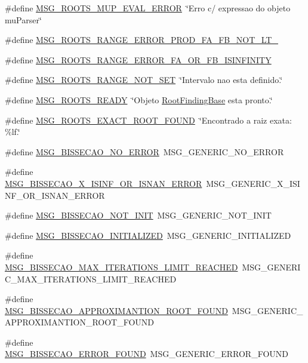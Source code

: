 \begin{CompactItemize}
\#define \hyperlink{group____messages_g4c5e1f67fc078b0bb717e112d9ecad23}{MSG\_\-ROOTS\_\-MUP\_\-EVAL\_\-ERROR}~\char`\"{}Erro c/ expressao do objeto muParser\char`\"{}
\item 
\#define \hyperlink{group____messages_g1257e2172f0d24792e5bae382b6c8ffd}{MSG\_\-ROOTS\_\-RANGE\_\-ERROR\_\-PROD\_\-FA\_\-FB\_\-NOT\_\-LT\_}
\item 
\#define \hyperlink{group____messages_ge0c1e0d68faa6da65e9ff27c587fe1e7}{MSG\_\-ROOTS\_\-RANGE\_\-ERROR\_\-FA\_\-OR\_\-FB\_\-ISINFINITY}
\item 
\#define \hyperlink{group____messages_g351b0a132b97b932e9152973ca84ab0f}{MSG\_\-ROOTS\_\-RANGE\_\-NOT\_\-SET}~\char`\"{}Intervalo nao esta definido.\char`\"{}
\item 
\#define \hyperlink{group____messages_gf99c4ab1f930201e0632f3d2e3267438}{MSG\_\-ROOTS\_\-READY}~\char`\"{}Objeto \hyperlink{structRootFindingBase}{RootFindingBase} esta pronto.\char`\"{}
\item 
\#define \hyperlink{group____messages_gb6dcd48efc265c326e568344c2040775}{MSG\_\-ROOTS\_\-EXACT\_\-ROOT\_\-FOUND}~\char`\"{}Encontrado a raiz exata: \%lf.\char`\"{}
\item 
\#define \hyperlink{group____messages_g1327a0d7098c8506ebbba8fa51a2861c}{MSG\_\-BISSECAO\_\-NO\_\-ERROR}~MSG\_\-GENERIC\_\-NO\_\-ERROR
\item 
\#define \hyperlink{group____messages_g40526857730e9af294e61ff82c37c989}{MSG\_\-BISSECAO\_\-X\_\-ISINF\_\-OR\_\-ISNAN\_\-ERROR}~MSG\_\-GENERIC\_\-X\_\-ISINF\_\-OR\_\-ISNAN\_\-ERROR
\item 
\#define \hyperlink{group____messages_g532d2bf3026df42582d5fa103bbc3188}{MSG\_\-BISSECAO\_\-NOT\_\-INIT}~MSG\_\-GENERIC\_\-NOT\_\-INIT
\item 
\#define \hyperlink{group____messages_gd7a7400cbd6447204201e1338a9faf5e}{MSG\_\-BISSECAO\_\-INITIALIZED}~MSG\_\-GENERIC\_\-INITIALIZED
\item 
\#define \hyperlink{group____messages_gad91cc85f95e709099e9e0b7c4c78648}{MSG\_\-BISSECAO\_\-MAX\_\-ITERATIONS\_\-LIMIT\_\-REACHED}~MSG\_\-GENERIC\_\-MAX\_\-ITERATIONS\_\-LIMIT\_\-REACHED
\item 
\#define \hyperlink{group____messages_g419a2b04764be63f8c5bd9a2d561fbdf}{MSG\_\-BISSECAO\_\-APPROXIMANTION\_\-ROOT\_\-FOUND}~MSG\_\-GENERIC\_\-APPROXIMANTION\_\-ROOT\_\-FOUND
\item 
\#define \hyperlink{group____messages_g045864209c190bf6517acac3482a4eeb}{MSG\_\-BISSECAO\_\-ERROR\_\-FOUND}~MSG\_\-GENERIC\_\-ERROR\_\-FOUND

\end{CompactItemize}
